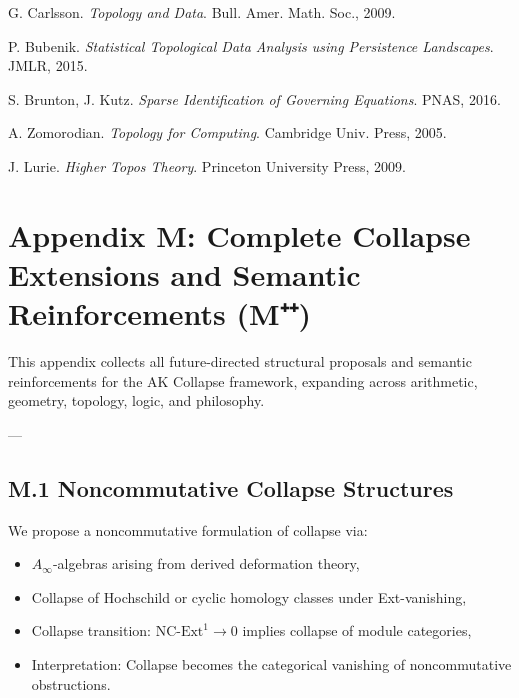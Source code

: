 \documentclass[11pt]{article}
\begin{document}
\begin{axiom}
\begin{axiom}
{{\begin{thebibliography}{9}

G. Carlsson.  
\textit{Topology and Data}. Bull. Amer. Math. Soc., 2009.

P. Bubenik.  
\textit{Statistical Topological Data Analysis using Persistence Landscapes}. JMLR, 2015.

S. Brunton, J. Kutz.  
\textit{Sparse Identification of Governing Equations}. PNAS, 2016.

A. Zomorodian.  
\textit{Topology for Computing}. Cambridge Univ. Press, 2005.

J. Lurie.  
\textit{Higher Topos Theory}. Princeton University Press, 2009.

\end{thebibliography}



\section*{Appendix M: Complete Collapse Extensions and Semantic Reinforcements (M⁺⁺)}

This appendix collects all future-directed structural proposals and semantic reinforcements  
for the AK Collapse framework, expanding across arithmetic, geometry, topology, logic, and philosophy.

---

\subsection*{M.1 Noncommutative Collapse Structures}

We propose a noncommutative formulation of collapse via:

\begin{itemize}
  \item $A_\infty$-algebras arising from derived deformation theory,
  \item Collapse of Hochschild or cyclic homology classes under Ext-vanishing,
  \item Collapse transition: $\text{NC-Ext}^1 \to 0$ implies collapse of module categories,
  \item Interpretation: Collapse becomes the categorical vanishing of noncommutative obstructions.
\end{itemize}

}}
\end{axiom}
\end{axiom}
\end{document}
